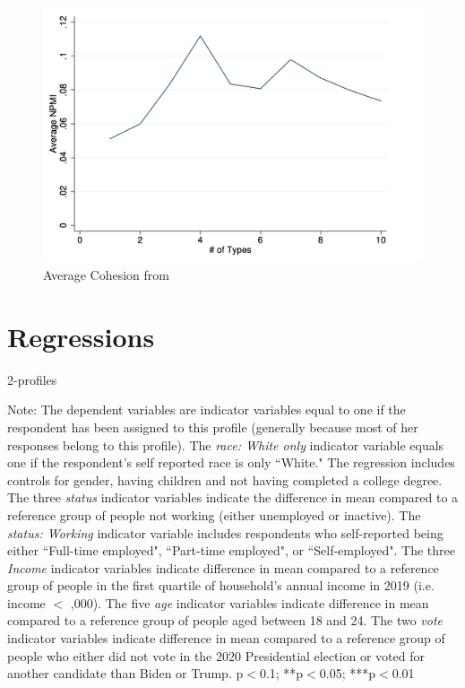 \documentclass{article}
\begin{document}
\begin{figure}[h!]
\caption{Average Cohesion from \cite{draca2020polarized}}
\begin{center}
\includegraphics[width=.8\textwidth]{cohesion_score_draca_schwarz.png}
\end{center}
\end{figure}

\clearpage

\section{Regressions}
\begin{table}[h!]
    \caption{2-profiles}
    \begin{center}
        \scalebox{0.7}{}
    \end{center}
    {\footnotesize Note: The dependent variables are indicator variables equal to one if the respondent has been assigned to this profile (generally because most of her responses belong to this profile). 
    The \textit{race: White only} indicator variable equals one if the respondent's self reported race is only ``White." The regression includes controls for gender, having children and not having completed a college degree. The three \textit{status} indicator variables indicate the difference in mean compared to a reference group of people not working (either unemployed or inactive). The \textit{status: Working} indicator variable includes respondents who self-reported being either ``Full-time employed", ``Part-time employed", or ``Self-employed". The three \textit{Income} indicator variables indicate difference in mean compared to a reference group of people in the first quartile of household's annual income in 2019 (i.e. income $<$ ,000). The five \textit{age} indicator variables indicate difference in mean compared to a reference group of people aged between 18 and 24. The two \textit{vote} indicator variables indicate difference in mean compared to a reference group of people who either did not vote in the 2020 Presidential election or voted for another candidate than Biden or Trump.
    \newline  *p$<$0.1; **p$<$0.05; ***p$<$0.01}
\end{table} 
\end{document}
